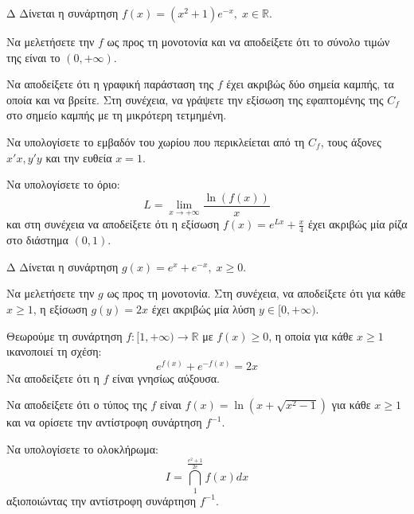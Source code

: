 \begin{thema}{Δ}
Δίνεται η συνάρτηση $\displaystyle f(x) = (x^2+1)e^{-x}, \; x \in \mathbb{R}$.
\begin{erwthma}
    \item Να μελετήσετε την $f$ ως προς τη μονοτονία και να αποδείξετε ότι το σύνολο τιμών της είναι το $(0, +\infty)$.
    \item Να αποδείξετε ότι η γραφική παράσταση της $f$ έχει ακριβώς δύο σημεία καμπής, τα οποία και να βρείτε. Στη συνέχεια, να γράψετε την εξίσωση της εφαπτομένης της $C_f$ στο σημείο καμπής με τη μικρότερη τετμημένη.
    \item Να υπολογίσετε το εμβαδόν του χωρίου που περικλείεται από τη $C_f$, τους άξονες $x'x, y'y$ και την ευθεία $x=1$.
    \item Να υπολογίσετε το όριο:
    \[ L = \lim_{x\to +\infty} \frac{\ln(f(x))}{x} \]
    και στη συνέχεια να αποδείξετε ότι η εξίσωση $\displaystyle f(x) = e^{L x} + \frac{x}{4}$ έχει ακριβώς μία ρίζα στο διάστημα $(0, 1)$.
\end{erwthma}
\end{thema}

\begin{thema}{Δ}
Δίνεται η συνάρτηση $g(x) = e^x + e^{-x}, \; x \ge 0$.
\begin{erwthma}
    \item Να μελετήσετε την $g$ ως προς τη μονοτονία. Στη συνέχεια, να αποδείξετε ότι για κάθε $x \ge 1$, η εξίσωση $g(y) = 2x$ έχει ακριβώς μία λύση $y \in [0, +\infty)$.
    \item Θεωρούμε τη συνάρτηση $f: [1, +\infty) \to \mathbb{R}$ με $f(x) \ge 0$, η οποία για κάθε $x \ge 1$ ικανοποιεί τη σχέση:
    \[ e^{f(x)} + e^{-f(x)} = 2x \]
    Να αποδείξετε ότι η $f$ είναι γνησίως αύξουσα.
    \item Να αποδείξετε ότι ο τύπος της $f$ είναι $\displaystyle f(x) = \ln\left(x + \sqrt{x^2-1}\right)$ για κάθε $x \ge 1$ και να ορίσετε την αντίστροφη συνάρτηση $f^{-1}$.
    \item Να υπολογίσετε το ολοκλήρωμα:
    \[ I = \dint_1^{\frac{e^2+1}{2e}} f(x) dx \]
    αξιοποιώντας την αντίστροφη συνάρτηση $f^{-1}$.
\end{erwthma}
\end{thema}

